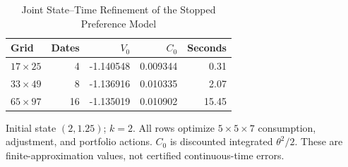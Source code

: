 \begin{table}[tbp]
\centering
\caption{Joint State--Time Refinement of the Stopped Preference Model}
\label{tab:ndu_refine}
\small
\begin{tabular}{@{}lrrrr@{}}
\toprule
Grid & Dates & $V_0$ & $C_0$ & Seconds \\
\midrule
$17\times 25$ & 4 & -1.140548 & 0.009344 & 0.31 \\
$33\times 49$ & 8 & -1.136916 & 0.010335 & 2.07 \\
$65\times 97$ & 16 & -1.135019 & 0.010902 & 15.45 \\
\bottomrule
\end{tabular}
\par\smallskip\begin{minipage}{\linewidth}\footnotesize Initial state $(2,1.25)$; $k=2$. All rows optimize $5\times5\times7$ consumption, adjustment, and portfolio actions. $C_0$ is discounted integrated $\theta^2/2$. These are finite-approximation values, not certified continuous-time errors.\end{minipage}
\end{table}
